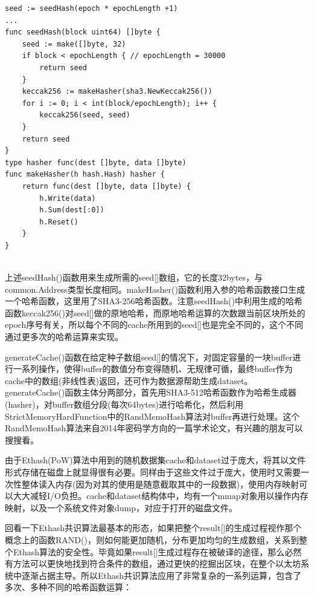 \documentclass[UTF8]{ctexart}
\begin{document}
{\begin{lstlisting}
seed := seedHash(epoch * epochLength +1)
...
func seedHash(block uint64) []byte {
    seed := make([]byte, 32)
    if block < epochLength { // epochLength = 30000
        return seed
    }
    keccak256 := makeHasher(sha3.NewKeccak256())
    for i := 0; i < int(block/epochLength); i++ {
        keccak256(seed, seed)
    }
    return seed
}
type hasher func(dest []byte, data []byte)
func makeHasher(h hash.Hash) hasher {
    return func(dest []byte, data []byte) {
        h.Write(data)
        h.Sum(dest[:0])
        h.Reset()
    }
}


\end{lstlisting}

上述seedHash()函数用来生成所需的seed[]数组，它的长度32bytes，与common.Address类型长度相同。makeHasher()函数利用入参的哈希函数接口生成一个哈希函数，这里用了SHA3-256哈希函数。注意seedHash()中利用生成的哈希函数keccak256()对seed[]做的原地哈希，而原地哈希运算的次数跟当前区块所处的epoch序号有关，所以每个不同的cache{}所用到的seed[]也是完全不同的，这个不同通过更多次的哈希运算来实现。




generateCache()函数在给定种子数组seed[]的情况下，对固定容量的一块buffer进行一系列操作，使得buffer的数值分布变得随机、无规律可循，最终buffer作为cache{}中的数组(非线性表)返回，还可作为数据源帮助生成dataset{}。generateCache()函数主体分两部分，首先用SHA3-512哈希函数作为哈希生成器(hasher)，对buffer数组分段(每次64bytes)进行哈希化，然后利用StrictMemoryHardFunction中的RandMemoHash算法对buffer再进行处理。这个RandMemoHash算法来自2014年密码学方向的一篇学术论文，有兴趣的朋友可以搜搜看。


由于Ethash(PoW)算法中用到的随机数据集cache{}和dataset{}过于庞大，将其以文件形式存储在磁盘上就显得很有必要。同样由于这些文件过于庞大，使用时又需要一次性整体读入内存(因为对其的使用是随意截取其中的一段数据)，使用内存映射可以大大减轻I/O负担。cache{}和dataset{}结构体中，均有一个mmap对象用以操作内存映射，以及一个系统文件对象dump，对应于打开的磁盘文件。




回看一下Ethash共识算法最基本的形态，如果把整个result[]的生成过程视作那个概念上的函数RAND()，则如何能更加随机，分布更加均匀的生成数组，关系到整个Ethash算法的安全性。毕竟如果result[]生成过程存在被破译的途径，那么必然有方法可以更快地找到符合条件的数组，通过更快的挖掘出区块，在整个以太坊系统中逐渐占据主导。所以Ethash共识算法应用了非常复杂的一系列运算，包含了多次、多种不同的哈希函数运算：

}
\end{document}
